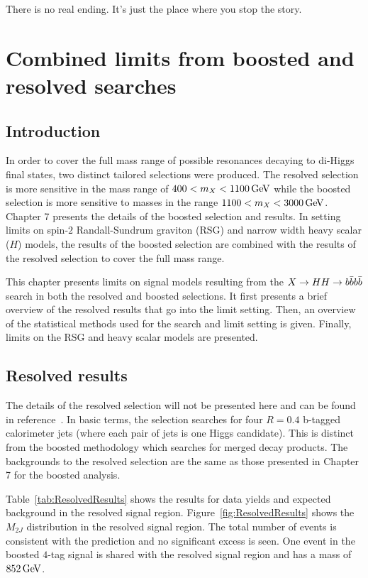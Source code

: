 \begin{savequote}[75mm]
There is no real ending. It’s just the place where you stop the story. 
\end{savequote}

\chapter{Combined limits from boosted and resolved searches}
\label{chap:4bcomb}

\section{Introduction}

In order to cover the full mass range of possible resonances decaying to di-Higgs final states, two distinct tailored selections were produced. The resolved selection is more sensitive in the mass range of $400 < m_{X} < 1100 \GeV$ while the boosted selection is more sensitive to masses in the range $1100 < m_{X} < 3000 \GeV$. Chapter 7 presents the details of the boosted selection and results. In setting limits on spin-$2$ Randall-Sundrum graviton (RSG) and narrow width heavy scalar ($H$) models, the results of the boosted selection are combined with the results of the resolved selection to cover the full mass range.

This chapter presents limits on signal models resulting from the $X\to HH \to b\bar{b}b\bar{b}$ search in both the resolved and boosted selections. It first presents a brief overview of the resolved results that go into the limit setting. Then, an overview of the statistical methods used for the search and limit setting is given. Finally, limits on the RSG and heavy scalar models are presented. 

\section{Resolved results}

The details of the resolved selection will not be presented here and can be found in reference~\cite{4bconf}. In basic terms, the selection searches for four $R = 0.4$ b-tagged calorimeter jets (where each pair of jets is one Higgs candidate). This is distinct from the boosted methodology which searches for merged decay products. The backgrounds to the resolved selection are the same as those presented in Chapter 7 for the boosted analysis. 

Table~\ref{tab:ResolvedResults} shows the results for data yields and expected background in the resolved signal region. Figure~\ref{fig:ResolvedResults} shows the $M_{2J}$ distribution in the resolved signal region. The total number of events is consistent with the prediction and no significant excess is seen. One event in the boosted $4$-tag signal is shared with the resolved signal region and has a mass of $852 \GeV$. 

